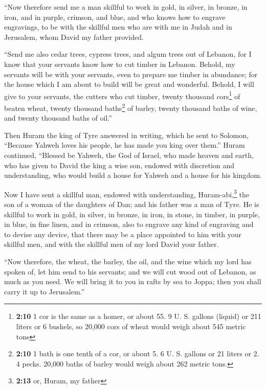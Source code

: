  ``Now therefore send me a man skillful to work in gold,
in silver, in bronze, in iron, and in purple, crimson, and blue, and who
knows how to engrave engravings, to be with the skillful men who are
with me in Judah and in Jerusalem, whom David my father provided.

 ``Send me also cedar trees, cypress trees, and algum
trees out of Lebanon, for I know that your servants know how to cut
timber in Lebanon. Behold, my servants will be with your servants,
 even to prepare me timber in abundance; for the house
which I am about to build will be great and wonderful. 
Behold, I will give to your servants, the cutters who cut timber, twenty
thousand cors\footnote{\textbf{2:10} 1 cor is the same as a homer, or
  about 55. 9 U. S. gallons (liquid) or 211 liters or 6 bushels, so
  20,000 cors of wheat would weigh about 545 metric tons} of beaten
wheat, twenty thousand baths\footnote{\textbf{2:10} 1 bath is one tenth
  of a cor, or about 5. 6 U. S. gallons or 21 liters or 2. 4 pecks.
  20,000 baths of barley would weigh about 262 metric tons.} of barley,
twenty thousand baths of wine, and twenty thousand baths of oil.''

 Then Huram the king of Tyre answered in writing, which
he sent to Solomon, ``Because Yahweh loves his people, he has made you
king over them.''  Huram continued, ``Blessed be Yahweh,
the God of Israel, who made heaven and earth, who has given to David the
king a wise son, endowed with discretion and understanding, who would
build a house for Yahweh and a house for his kingdom.

 Now I have sent a skillful man, endowed with
understanding, Huram-abi,\footnote{\textbf{2:13} or, Huram, my father}
 the son of a woman of the daughters of Dan; and his
father was a man of Tyre. He is skillful to work in gold, in silver, in
bronze, in iron, in stone, in timber, in purple, in blue, in fine linen,
and in crimson, also to engrave any kind of engraving and to devise any
device, that there may be a place appointed to him with your skillful
men, and with the skillful men of my lord David your father.

 ``Now therefore, the wheat, the barley, the oil, and the
wine which my lord has spoken of, let him send to his servants;
 and we will cut wood out of Lebanon, as much as you
need. We will bring it to you in rafts by sea to Joppa; then you shall
carry it up to Jerusalem.''

